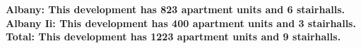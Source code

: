 \bf{Albany}: This development has 823 apartment units and 6 stairhalls.\\\bf{Albany Ii}: This development has 400 apartment units and 3 stairhalls.\\\bf{Total}: This development has 1223 apartment units and 9 stairhalls.\\